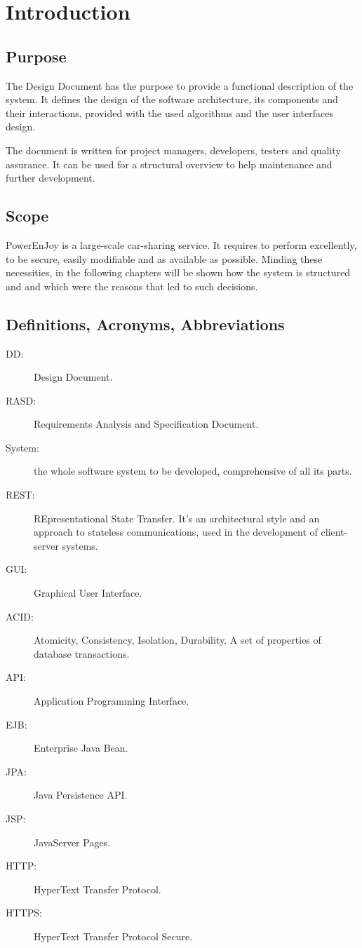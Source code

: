 \section{Introduction} \label{sec introduction}


\subsection{Purpose}

The Design Document has the purpose to provide a functional description of the system. It defines the design of the software architecture, its components and their interactions, provided with the used algorithms and the user interfaces design. 

The document is written for project managers, developers, testers and quality assurance. It can be used for a structural overview to help maintenance and further development.


\subsection{Scope}

PowerEnJoy is a large-scale car-sharing service. It requires to perform excellently, to be secure, easily modifiable and as available as possible. Minding these necessities, in the following chapters will be shown how the system is structured and and which were the reasons that led to such decisions.
  
\subsection{Definitions, Acronyms, Abbreviations}

\begin{description}
	\item[DD:] Design Document.
	\item[RASD:] Requirements Analysis and Specification Document.
	\item[System:] the whole software system to be developed, comprehensive of all its parts.
	\item[REST:] REpresentational State Transfer. It's an architectural style and an approach to stateless communications, used in the development of client-server systems.
	\item[GUI:] Graphical User Interface.
	\item[ACID:] Atomicity, Consistency, Isolation, Durability. A set of properties of database transactions.
	\item[API:] Application Programming Interface.
	\item[EJB:] Enterprise Java Bean.
	\item[JPA:] Java Persistence API.
	\item[JSP:] JavaServer Pages.
	\item[HTTP:] HyperText Transfer Protocol.
	\item[HTTPS:] HyperText Transfer Protocol Secure.
\end{description}

